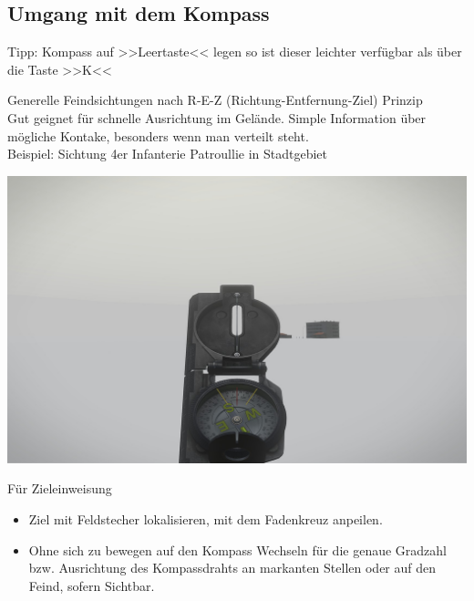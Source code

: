 \newpage

\subsection{Umgang mit dem Kompass}

	Tipp: Kompass auf >>Leertaste<< legen so ist dieser leichter verfügbar als über die Taste >>K<<

	Generelle Feindsichtungen nach R-E-Z (Richtung-Entfernung-Ziel) Prinzip \\

	Gut geignet für schnelle Ausrichtung im Gelände. Simple Information über mögliche Kontake, besonders wenn man verteilt steht. \\


	Beispiel: Sichtung 4er Infanterie Patroullie in Stadtgebiet \\
\begin{minipage}[t]{1\textwidth}
	\includegraphics[width=\textwidth]{./Grafiken/KarteUndMarkierungen/Kompass1.jpg}
\end{minipage}

	Für Zieleinweisung
		\begin{itemize}
 			\item Ziel mit Feldstecher lokalisieren, mit dem Fadenkreuz anpeilen.
			\item Ohne sich zu bewegen auf den Kompass Wechseln für die genaue Gradzahl bzw. Ausrichtung des Kompassdrahts an markanten Stellen oder auf den Feind, sofern Sichtbar.
		\end{itemize}

